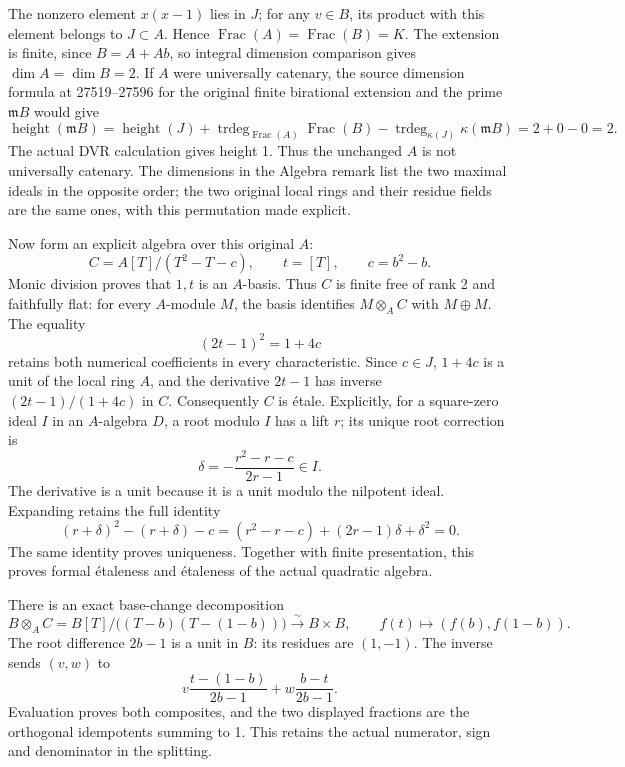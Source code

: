 The nonzero element \(x(x-1)\) lies in \(J\); for any \(v\in B\), its product with this element belongs to \(J\subset A\). Hence \(\operatorname{Frac}(A)=\operatorname{Frac}(B)=K\). The extension is finite, since \(B=A+Ab\), so integral dimension comparison gives \(\dim A=\dim B=2\). If \(A\) were universally catenary, the source dimension formula at 27519--27596 for the original finite birational extension and the prime \(\mathfrak mB\) would give \[
 \operatorname{height}(\mathfrak mB)
 =\operatorname{height}(J)
   +\operatorname{trdeg}_{\operatorname{Frac}(A)}\operatorname{Frac}(B)
   -\operatorname{trdeg}_{\kappa(J)}\kappa(\mathfrak mB)
 =2+0-0=2.
\] The actual DVR calculation gives height 1. Thus the unchanged \(A\) is not universally catenary. The dimensions in the Algebra remark list the two maximal ideals in the opposite order; the two original local rings and their residue fields are the same ones, with this permutation made explicit.

Now form an explicit algebra over this original \(A\): \[
 C=A[T]/(T^2-T-c),\qquad t=[T],\qquad c=b^2-b.
\] Monic division proves that \(1,t\) is an \(A\)-basis. Thus \(C\) is finite free of rank 2 and faithfully flat: for every \(A\)-module \(M\), the basis identifies \(M\otimes_AC\) with \(M\oplus M\). The equality \[
 (2t-1)^2=1+4c
\] retains both numerical coefficients in every characteristic. Since \(c\in J\), \(1+4c\) is a unit of the local ring \(A\), and the derivative \(2t-1\) has inverse \((2t-1)/(1+4c)\) in \(C\). Consequently \(C\) is étale. Explicitly, for a square-zero ideal \(I\) in an \(A\)-algebra \(D\), a root modulo \(I\) has a lift \(r\); its unique root correction is \[
 \delta=-\frac{r^2-r-c}{2r-1}\in I.
\] The derivative is a unit because it is a unit modulo the nilpotent ideal. Expanding retains the full identity \[
 (r+\delta)^2-(r+\delta)-c
 =(r^2-r-c)+(2r-1)\delta+\delta^2=0.
\] The same identity proves uniqueness. Together with finite presentation, this proves formal étaleness and étaleness of the actual quadratic algebra.

There is an exact base-change decomposition \[
 B\otimes_AC=B[T]/\bigl((T-b)(T-(1-b))\bigr)
 \xrightarrow{\sim}B\times B,
 \qquad f(t)\longmapsto(f(b),f(1-b)).
\] The root difference \(2b-1\) is a unit in \(B\): its residues are \((1,-1)\). The inverse sends \((v,w)\) to \[
 v\frac{t-(1-b)}{2b-1}
 +w\frac{b-t}{2b-1}.
\] Evaluation proves both composites, and the two displayed fractions are the orthogonal idempotents summing to 1. This retains the actual numerator, sign and denominator in the splitting.

